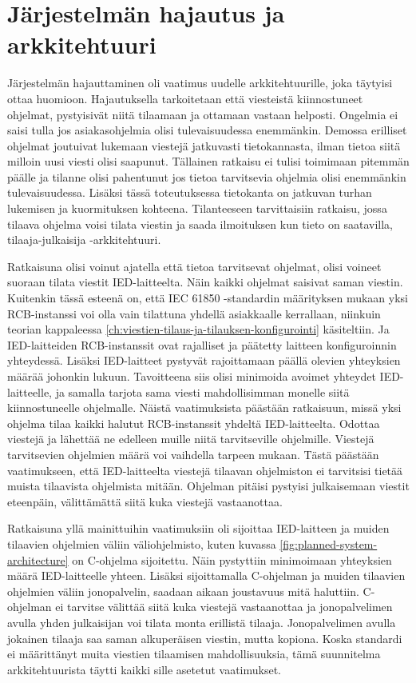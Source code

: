 \section{Järjestelmän hajautus ja arkkitehtuuri}
\label{ch:järjestelmän-hajautus-ja-arkkitehtuuri}
Järjestelmän hajauttaminen oli vaatimus uudelle arkkitehtuurille, joka täytyisi ottaa huomioon. Hajautuksella tarkoitetaan että viesteistä kiinnostuneet ohjelmat, pystyisivät niitä tilaamaan ja ottamaan vastaan helposti. Ongelmia ei saisi tulla jos asiakasohjelmia olisi tulevaisuudessa enemmänkin. Demossa erilliset ohjelmat joutuivat lukemaan viestejä jatkuvasti tietokannasta, ilman tietoa siitä milloin uusi viesti olisi saapunut. Tällainen ratkaisu ei tulisi toimimaan pitemmän päälle ja tilanne olisi pahentunut jos tietoa tarvitsevia ohjelmia olisi enemmänkin tulevaisuudessa. Lisäksi tässä toteutuksessa tietokanta on jatkuvan turhan lukemisen ja kuormituksen kohteena. Tilanteeseen tarvittaisiin ratkaisu, jossa tilaava ohjelma voisi tilata viestin ja saada ilmoituksen kun tieto on saatavilla, tilaaja-julkaisija -arkkitehtuuri.

Ratkaisuna olisi voinut ajatella että tietoa tarvitsevat ohjelmat, olisi voineet suoraan tilata viestit IED-laitteelta. Näin kaikki ohjelmat saisivat saman viestin. Kuitenkin tässä esteenä on, että IEC 61850 -standardin määrityksen mukaan yksi RCB-instanssi voi olla vain tilattuna yhdellä asiakkaalle kerrallaan, niinkuin teorian kappaleessa \ref{ch:viestien-tilaus-ja-tilauksen-konfigurointi} käsiteltiin. Ja IED-laitteiden RCB-instanssit ovat rajalliset ja päätetty laitteen konfiguroinnin yhteydessä. Lisäksi IED-laitteet pystyvät rajoittamaan päällä olevien yhteyksien määrää johonkin lukuun. Tavoitteena siis olisi minimoida avoimet yhteydet IED-laitteelle, ja samalla tarjota sama viesti mahdollisimman monelle siitä kiinnostuneelle ohjelmalle. Näistä vaatimuksista päästään ratkaisuun, missä yksi ohjelma tilaa kaikki halutut RCB-instanssit yhdeltä IED-laitteelta. Odottaa viestejä ja lähettää ne edelleen muille niitä tarvitseville ohjelmille. Viestejä tarvitsevien ohjelmien määrä voi vaihdella tarpeen mukaan. Tästä päästään vaatimukseen, että IED-laitteelta viestejä tilaavan ohjelmiston ei tarvitsisi tietää muista tilaavista ohjelmista mitään. Ohjelman pitäisi pystyisi julkaisemaan viestit eteenpäin, välittämättä siitä kuka viestejä vastaanottaa.

Ratkaisuna yllä mainittuihin vaatimuksiin oli sijoittaa IED-laitteen ja muiden tilaavien ohjelmien väliin väliohjelmisto, kuten kuvassa \ref{fig:planned-system-architecture} on C-ohjelma sijoitettu. Näin pystyttiin minimoimaan yhteyksien määrä IED-laitteelle yhteen. Lisäksi sijoittamalla C-ohjelman ja muiden tilaavien ohjelmien väliin jonopalvelin, saadaan aikaan joustavuus mitä haluttiin. C-ohjelman ei tarvitse välittää siitä kuka viestejä vastaanottaa ja jonopalvelimen avulla yhden julkaisijan voi tilata monta erillistä tilaaja. Jonopalvelimen avulla jokainen tilaaja saa saman alkuperäisen viestin, mutta kopiona. Koska standardi ei määrittänyt muita viestien tilaamisen mahdollisuuksia, tämä suunnitelma arkkitehtuurista täytti kaikki sille asetetut vaatimukset.

